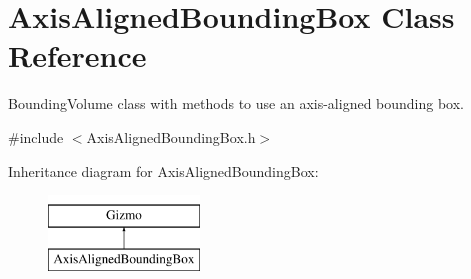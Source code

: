 \hypertarget{class_axis_aligned_bounding_box}{\section{Axis\+Aligned\+Bounding\+Box Class Reference}
\label{class_axis_aligned_bounding_box}
}


Bounding\+Volume class with methods to use an axis-\/aligned bounding box.  




{\ttfamily \#include $<$Axis\+Aligned\+Bounding\+Box.\+h$>$}

Inheritance diagram for Axis\+Aligned\+Bounding\+Box\+:\begin{figure}[H]
\begin{center}
\leavevmode
\includegraphics[height=2.000000cm]{class_axis_aligned_bounding_box}
\end{center}
\end{figure}
